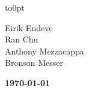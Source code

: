 \documentclass[11pt,letterpaper,twoside,english,final]{article}
\begin{document}
\begin{titlepage}
\def\author#1{\large{\textsf{#1}}\\ }

\def\date#1{{\vspace{.25 in}

\large{\bfseries{\textsf{#1}}}\\ }}

\def\authordate#1{

\noindent
\vskip 6.8pt
\vtop to0pt{
\setlength{\parindent}{112mm}

#1\vss}}

\authordate{
\author{Eirik Endeve}
\author{Ran Chu}
\author{Anthony Mezzacappa}
\author{Bronson Messer}
\date{\today}}

\ApprovedBox             %


\setlength{\parindent}{0pt}

\bigskip
\noindent

\thispagestyle{fancy}
\fancyfoot{}
\renewcommand{\headrulewidth}{0pt}
\addtolength{\footskip}{0.3in}


\end{titlepage}

\newpage


 \newpage 

\thispagestyle{empty}                           %
\vspace*{\fill}
\end{document}
